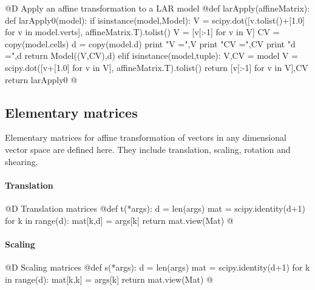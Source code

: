 \documentclass[11pt,oneside]{article}	%
\begin{document}
@D Apply an affine transformation to a LAR model 
@{def larApply(affineMatrix):
	def larApply0(model):
		if isinstance(model,Model):
			V = scipy.dot([v.tolist()+[1.0] for v in model.verts], affineMatrix.T).tolist()
			V = [v[:-1] for v in V]
			CV = copy(model.cells)
			d = copy(model.d)
			print "\n V =",V
			print "\n CV =",CV
			print "\n d =",d
			return Model((V,CV),d)
		elif isinstance(model,tuple):
			V,CV = model
			V = scipy.dot([v+[1.0] for v in V], affineMatrix.T).tolist()
			return [v[:-1] for v in V],CV
	return larApply0
@}


\subsection{Elementary matrices}
Elementary matrices for affine transformation of vectors in any dimensional vector space are defined here. They include translation, scaling, rotation and shearing. 

\paragraph{Translation}
@D Translation matrices
@{def t(*args): 
	d = len(args)
	mat = scipy.identity(d+1)
	for k in range(d): 
		mat[k,d] = args[k]
	return mat.view(Mat)
@}
\paragraph{Scaling}
@D Scaling matrices
@{def s(*args): 
	d = len(args)
	mat = scipy.identity(d+1)
	for k in range(d): 
		mat[k,k] = args[k]
	return mat.view(Mat)
@}
\end{document}
